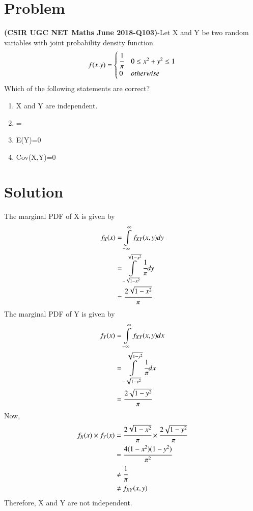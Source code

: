 \documentclass[journal,12pt,twocolumn]{IEEEtran}
\begin{document}
\section*{\textbf{Problem}}
\textbf{(CSIR UGC NET Maths June 2018-Q103)}-Let X and Y be two random variables with joint probability density function
\begin{align*}
    f(x.y)=
    \begin{cases}
    \cfrac{1}{\pi} & 0\le x^2 + y^2 \le 1\\
    0 & otherwise
    \end{cases}
\end{align*}
Which of the following statements are correct?
\begin{enumerate}
    \item
    X and Y are independent.
    
    \item
    =
    
    \item
    E(Y)=0
    
    \item
    Cov(X,Y)=0
\end{enumerate}
\section*{\textbf{Solution}}
The marginal PDF of X is given by
\begin{align}
    f_X(x)&=\displaystyle\int\limits_{-\infty}^{\infty} f_{XY}(x,y) dy\\
          &=\displaystyle\int\limits_{-\sqrt{1-x^2}}^{\sqrt{1-x^2}}\cfrac{1}{\pi} dy\\
          &=\cfrac{2\sqrt{1-x^2}}{\pi}
\end{align}
The marginal PDF of Y is given by
\begin{align}
    f_Y(x)&=\displaystyle\int\limits_{-\infty}^{\infty} f_{XY}(x,y) dx\\
          &=\displaystyle\int\limits_{-\sqrt{1-y^2}}^{\sqrt{1-y^2}}\cfrac{1}{\pi} dx\\
          &=\cfrac{2\sqrt{1-y^2}}{\pi}
\end{align}
Now,
\begin{align}
    f_X(x)\times f_Y(x) &=\cfrac{2\sqrt{1-x^2}}{\pi} \times\cfrac{2\sqrt{1-y^2}}{\pi}\\
    &= \cfrac{4(1-x^2)(1-y^2)}{\pi^2}\\
    &\neq \cfrac{1}{\pi}\\
    &\neq f_{XY}(x,y)
\end{align}
Therefore, X and Y are not independent.\\
\end{document}
